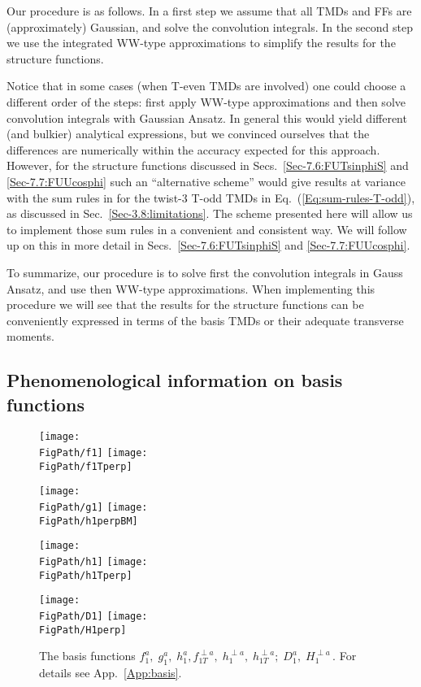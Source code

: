 \documentclass[a4paper,11pt]{article}
\newcommand*{\FigPath}{./figs}%
\begin{document}
Our procedure is as follows. In a first step we assume that all TMDs and 
FFs are (approximately) Gaussian, and solve the convolution integrals.
In the second step we use the integrated WW-type approximations to
simplify the results for the structure functions.

Notice that in some cases (when T-even TMDs are involved) 
one could choose a different order of the steps: first apply 
WW-type approximations and then solve convolution integrals 
with Gaussian Ansatz.
In general this would yield different (and bulkier) analytical 
expressions, but we convinced ourselves that the differences 
are numerically within the accuracy expected for this approach.
However, for the structure functions discussed in
Secs.~\ref{Sec-7.6:FUTsinphiS} and \ref{Sec-7.7:FUUcosphi}
such an ``alternative scheme'' would give results at
variance with the sum rules in for the twist-3 T-odd TMDs
in Eq.~(\ref{Eq:sum-rules-T-odd}), as discussed in 
Sec.~\ref{Sec-3.8:limitations}. 
The scheme presented here will allow us to implement those sum 
rules in a convenient and consistent way. We will follow up on 
this in more detail in 
Secs.~\ref{Sec-7.6:FUTsinphiS} and \ref{Sec-7.7:FUUcosphi}.

To summarize, our procedure is to solve first the convolution 
integrals in Gauss Ansatz, and use then WW-type approximations.
When implementing this procedure we will see that the results 
for the structure functions can be conveniently expressed in 
terms of the basis TMDs or their adequate transverse moments. 





\subsection{Phenomenological information on basis functions}
\label{Sec-4.3:plot-basis-functions}

\begin{figure}[b!]
\centering
\texttt{[image: \\FigPath/f1]} 
\texttt{[image: \\FigPath/f1Tperp]}
  
\texttt{[image: \\FigPath/g1]}  
\texttt{[image: \\FigPath/h1perpBM]}  

\texttt{[image: \\FigPath/h1]}  
\texttt{[image: \\FigPath/h1Tperp]}


\texttt{[image: \\FigPath/D1]} 
\texttt{[image: \\FigPath/H1perp]} 
\caption{\label{basis} 
	The basis functions $f_1^a, \; g_1^a, \; h_1^a, 
	f_{1T}^{\perp a}, \;h_1^{\perp a},\; h_{1T}^{\perp a}; \; 
	D_1^a, \; H_1^{\perp a} \,$. For details see App.~\ref{App:basis}.}
\end{figure}
\end{document}
